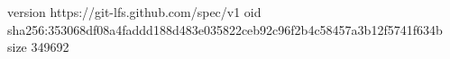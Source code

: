 version https://git-lfs.github.com/spec/v1
oid sha256:353068df08a4faddd188d483e035822ceb92c96f2b4c58457a3b12f5741f634b
size 349692
